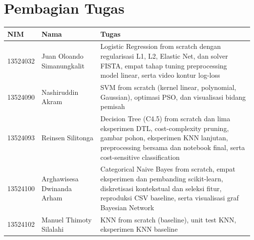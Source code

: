 \chapter*{Pembagian Tugas}


\begin{table}[H]
\centering
\begin{tabularx}{\textwidth}{llX}
\toprule
NIM & Nama & Tugas \\
\midrule
13524032 & Juan Oloando Simanungkalit & Logistic Regression from scratch dengan regularisasi L1, L2, Elastic Net, dan solver FISTA, empat tahap tuning preprocessing model linear, serta video kontur log-loss \\
13524090 & Nashiruddin Akram & SVM from scratch (kernel linear, polynomial, Gaussian), optimasi PSO, dan visualisasi bidang pemisah \\
13524093 & Reinsen Silitonga & Decision Tree (C4.5) from scratch dan lima eksperimen DTL, cost-complexity pruning, gambar pohon, eksperimen KNN lanjutan, preprocessing bersama dan notebook final, serta cost-sensitive classification \\
13524100 & Arghawisesa Dwinanda Arham & Categorical Naive Bayes from scratch, empat eksperimen dan pembanding scikit-learn, diskretisasi kontekstual dan seleksi fitur, reproduksi CSV baseline, serta visualisasi graf Bayesian Network \\
13524102 & Manuel Thimoty Silalahi & KNN from scratch (baseline), unit test KNN, eksperimen KNN baseline \\
\bottomrule
\end{tabularx}
\end{table}
